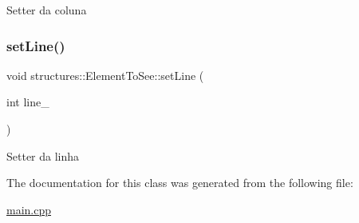Setter da coluna \mbox{\label{classstructures_1_1ElementToSee_a560a8217529d80a231f5c2da9b090d2b}} 
\subsubsection{\texorpdfstring{set\+Line()}{setLine()}}
{\footnotesize\ttfamily void structures\+::\+Element\+To\+See\+::set\+Line (\begin{DoxyParamCaption}\item[{int}]{line\+\_\+ }\end{DoxyParamCaption})}

Setter da linha 

The documentation for this class was generated from the following file\+:\begin{DoxyCompactItemize}
\item 
\hyperlink{main_8cpp}{main.\+cpp}\end{DoxyCompactItemize}
